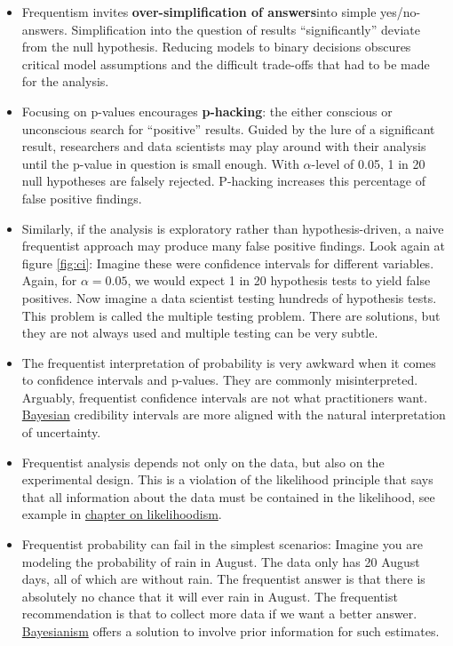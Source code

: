 \documentclass[
  10pt,
]{scrbook}
\providecommand{\tightlist}{%
  \setlength{\itemsep}{0pt}\setlength{\parskip}{0pt}}
\begin{document}
\begin{itemize}
\tightlist
\item
  Frequentism invites \textbf{over-simplification of answers}into simple yes/no-answers. Simplification into the question of results ``significantly'' deviate from the null hypothesis. Reducing models to binary decisions obscures critical model assumptions and the difficult trade-offs that had to be made for the analysis.
\item
  Focusing on p-values encourages \textbf{p-hacking}: the either conscious or unconscious search for ``positive'' results. Guided by the lure of a significant result, researchers and data scientists may play around with their analysis until the p-value in question is small enough. With \(\alpha\)-level of 0.05, 1 in 20 null hypotheses are falsely rejected. P-hacking increases this percentage of false positive findings.
\item
  Similarly, if the analysis is exploratory rather than hypothesis-driven, a naive frequentist approach may produce many false positive findings. Look again at figure \ref{fig:ci}: Imagine these were confidence intervals for different variables. Again, for \(\alpha = 0.05\), we would expect 1 in 20 hypothesis tests to yield false positives. Now imagine a data scientist testing hundreds of hypothesis tests. This problem is called the multiple testing problem. There are solutions, but they are not always used and multiple testing can be very subtle.
\item
  The frequentist interpretation of probability is very awkward when it comes to confidence intervals and p-values. They are commonly misinterpreted. Arguably, frequentist confidence intervals are not what practitioners want. \protect\hyperlink{bayesian}{Bayesian} credibility intervals are more aligned with the natural interpretation of uncertainty.
\item
  Frequentist analysis depends not only on the data, but also on the experimental design. This is a violation of the likelihood principle that says that all information about the data must be contained in the likelihood, see example in \protect\hyperlink{likelihoodism}{chapter on likelihoodism}.
\item
  Frequentist probability can fail in the simplest scenarios: Imagine you are modeling the probability of rain in August. The data only has 20 August days, all of which are without rain. The frequentist answer is that there is absolutely no chance that it will ever rain in August. The frequentist recommendation is that to collect more data if we want a better answer. \protect\hyperlink{bayesian}{Bayesianism} offers a solution to involve prior information for such estimates.

\end{itemize}
\end{document}
